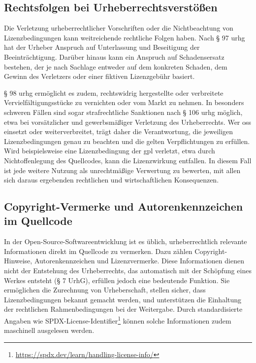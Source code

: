 
\subsection{Rechtsfolgen bei Urheberrechtsverstößen}\label{subsec:rechtsfolgen-bei-urheberrechtsverstoen}

Die Verletzung urheberrechtlicher Vorschriften oder die Nichtbeachtung von Lizenzbedingungen kann weitreichende rechtliche Folgen haben.
Nach § 97 \gls{urhg} hat der Urheber Anspruch auf Unterlassung und Beseitigung der Beeinträchtigung.
Darüber hinaus kann ein Anspruch auf Schadensersatz bestehen, der je nach Sachlage entweder auf dem konkreten Schaden, dem Gewinn des Verletzers oder einer fiktiven Lizenzgebühr basiert.

§ 98 \gls{urhg} ermöglicht es zudem, rechtswidrig hergestellte oder verbreitete Vervielfältigungsstücke zu vernichten oder vom Markt zu nehmen.
In besonders schweren Fällen sind sogar strafrechtliche Sanktionen nach § 106 \gls{urhg} möglich, etwa bei vorsätzlicher und gewerbsmäßiger Verletzung des Urheberrechts.
Wer \gls{oss} einsetzt oder weiterverbreitet, trägt daher die Verantwortung, die jeweiligen Lizenzbedingungen genau zu beachten und die gelten Verpflichtungen zu erfüllen.
Wird beispielsweise eine Lizenzbedingung der \gls{gpl} verletzt, etwa durch Nichtoffenlegung des Quellcodes, kann die Lizenzwirkung entfallen.
In diesem Fall ist jede weitere Nutzung als unrechtmäßige Verwertung zu bewerten, mit allen sich daraus ergebenden rechtlichen und wirtschaftlichen Konsequenzen.


\subsection{Copyright-Vermerke und Autorenkennzeichen im Quellcode}

In der Open-Source-Softwareentwicklung ist es üblich, urheberrechtlich relevante Informationen direkt im Quellcode zu vermerken.
Dazu zählen Copyright-Hinweise, Autorenkennzeichen und Lizenzvermerke.
Diese Informationen dienen nicht der Entstehung des Urheberrechts, das automatisch mit der Schöpfung eines Werkes entsteht (§ 7 UrhG), erfüllen jedoch eine bedeutende Funktion.
Sie ermöglichen die Zurechnung von Urheberschaft, stellen sicher, dass Lizenzbedingungen bekannt gemacht werden, und unterstützen die Einhaltung der rechtlichen Rahmenbedingungen bei der Weitergabe.
Durch standardisierte Angaben wie SPDX-License-Identifier\footnote{\url{https://spdx.dev/learn/handling-license-info/}} können solche Informationen zudem maschinell ausgelesen werden.

